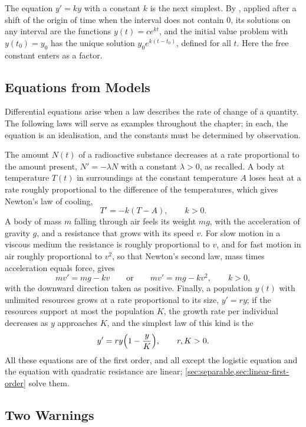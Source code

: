 The equation $y'=ky$ with a constant $k$ is the next simplest. By , applied after a shift of the origin of time when the interval does not contain $0$, its solutions on any interval are the functions $y(t)=ce^{kt}$, and the initial value problem with $y(t_0)=y_0$ has the unique solution $y_0e^{k(t-t_0)}$, defined for all $t$. Here the free constant enters as a factor.

\subsection{Equations from Models}

Differential equations arise when a law describes the rate of change of a quantity. The following laws will serve as examples throughout the chapter; in each, the equation is an idealisation, and the constants must be determined by observation.

The amount $N(t)$ of a radioactive substance decreases at a rate proportional to the amount present, $N'=-\lambda N$ with a constant $\lambda>0$, as  recalled. A body at temperature $T(t)$ in surroundings at the constant temperature $A$ loses heat at a rate roughly proportional to the difference of the temperatures, which gives Newton's law of cooling,
\[
T'=-k(T-A),\qquad k>0 .
\]
A body of mass $m$ falling through air feels its weight $mg$, with the acceleration of gravity $g$, and a resistance that grows with its speed $v$. For slow motion in a viscous medium the resistance is roughly proportional to $v$, and for fast motion in air roughly proportional to $v^2$, so that Newton's second law, mass times acceleration equals force, gives
\[
mv'=mg-kv\qquad\text{or}\qquad mv'=mg-kv^2,\qquad k>0,
\]
with the downward direction taken as positive. Finally, a population $y(t)$ with unlimited resources grows at a rate proportional to its size, $y'=ry$; if the resources support at most the population $K$, the growth rate per individual decreases as $y$ approaches $K$, and the simplest law of this kind is the 
\begin{equation}
y'=ry\Bigl(1-\frac yK\Bigr),\qquad r,K>0 .
\label{eq:logistic}
\end{equation}
All these equations are of the first order, and all except the logistic equation and the equation with quadratic resistance are linear; \cref{sec:separable,sec:linear-first-order} solve them.

\subsection{Two Warnings}

